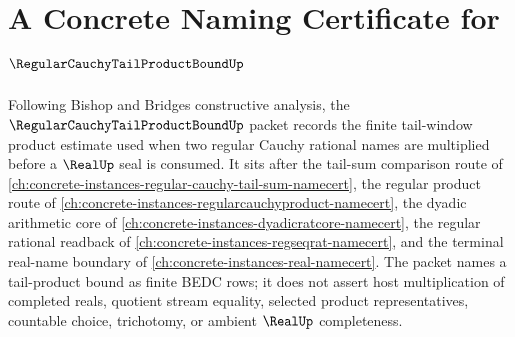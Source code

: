 \chapter{A Concrete Naming Certificate for $\RegularCauchyTailProductBoundUp$}
\label{ch:concrete-instances-regular-cauchy-tail-product-bound-namecert}

Following Bishop and Bridges constructive analysis, the $\RegularCauchyTailProductBoundUp$ packet records the finite tail-window product estimate used when two regular Cauchy rational names are multiplied before a $\RealUp$ seal is consumed. It sits after the tail-sum comparison route of \autoref{ch:concrete-instances-regular-cauchy-tail-sum-namecert}, the regular product route of \autoref{ch:concrete-instances-regularcauchyproduct-namecert}, the dyadic arithmetic core of \autoref{ch:concrete-instances-dyadicratcore-namecert}, the regular rational readback of \autoref{ch:concrete-instances-regseqrat-namecert}, and the terminal real-name boundary of \autoref{ch:concrete-instances-real-namecert}. The packet names a tail-product bound as finite BEDC rows; it does not assert host multiplication of completed reals, quotient stream equality, selected product representatives, countable choice, trichotomy, or ambient $\RealUp$ completeness.


